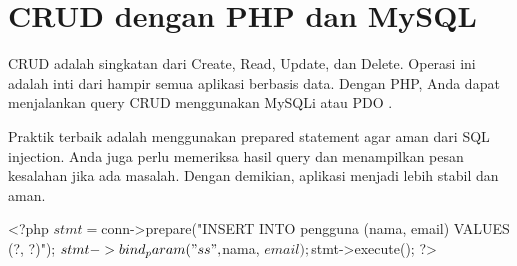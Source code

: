 \section{CRUD dengan PHP dan MySQL}
CRUD adalah singkatan dari Create, Read, Update, dan Delete. Operasi ini adalah inti dari hampir semua aplikasi berbasis data. Dengan PHP, Anda dapat menjalankan query CRUD menggunakan MySQLi atau PDO \cite{mysqlGettingStarted}.

Praktik terbaik adalah menggunakan prepared statement agar aman dari SQL injection. Anda juga perlu memeriksa hasil query dan menampilkan pesan kesalahan jika ada masalah. Dengan demikian, aplikasi menjadi lebih stabil dan aman.

\begin{webcode}[language=PHP, caption={Insert Data dengan Prepared Statement}]
<?php
$stmt = $conn->prepare("INSERT INTO pengguna (nama, email) VALUES (?, ?)");
$stmt->bind_param("ss", $nama, $email);
$stmt->execute();
?>
\end{webcode}

